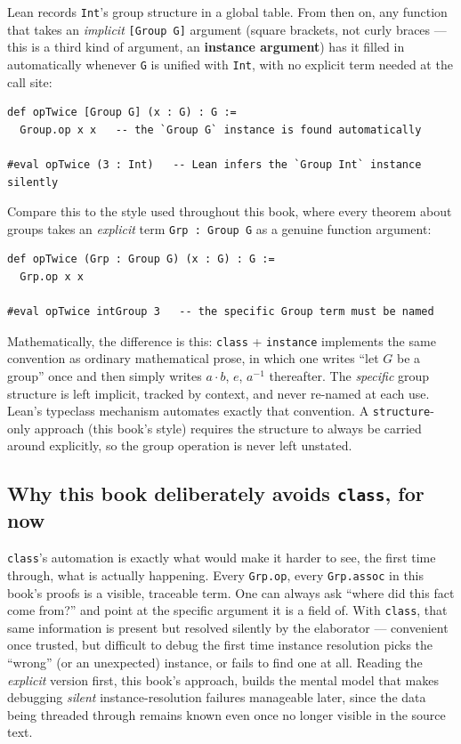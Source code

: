 Lean records \texttt{Int}'s group structure in a global table. From then on, any function that takes an \emph{implicit} \texttt{[Group G]} argument (square brackets, not curly braces --- this is a third kind of argument, an \textbf{instance argument}) has it filled in automatically whenever \texttt{G} is unified with \texttt{Int}, with no explicit term needed at the call site:

\begin{lstlisting}
def opTwice [Group G] (x : G) : G :=
  Group.op x x   -- the `Group G` instance is found automatically

#eval opTwice (3 : Int)   -- Lean infers the `Group Int` instance silently
\end{lstlisting}

Compare this to the style used throughout this book, where every theorem about groups takes an \emph{explicit} term \texttt{Grp : Group G} as a genuine function argument:

\begin{lstlisting}
def opTwice (Grp : Group G) (x : G) : G :=
  Grp.op x x

#eval opTwice intGroup 3   -- the specific Group term must be named
\end{lstlisting}

Mathematically, the difference is this: \texttt{class} + \texttt{instance} implements the same convention as ordinary mathematical prose, in which one writes ``let \(G\) be a group'' once and then simply writes \(a \cdot b\), \(e\), \(a^{-1}\) thereafter. The \emph{specific} group structure is left implicit, tracked by context, and never re-named at each use. Lean's typeclass mechanism automates exactly that convention. A \texttt{structure}-only approach (this book's style) requires the structure to always be carried around explicitly, so the group operation is never left unstated.

\subsection{\texorpdfstring{Why this book deliberately avoids \texttt{class}, for now}{Why this book deliberately avoids class, for now}}\label{sec:05-rigor-check:01-structure-vs-class:3}

\texttt{class}'s automation is exactly what would make it harder to see, the first time through, what is actually happening. Every \texttt{Grp.op}, every \texttt{Grp.assoc} in this book's proofs is a visible, traceable term. One can always ask ``where did this fact come from?'' and point at the specific argument it is a field of. With \texttt{class}, that same information is present but resolved silently by the elaborator --- convenient once trusted, but difficult to debug the first time instance resolution picks the ``wrong'' (or an unexpected) instance, or fails to find one at all. Reading the \emph{explicit} version first, this book's approach, builds the mental model that makes debugging \emph{silent} instance-resolution failures manageable later, since the data being threaded through remains known even once no longer visible in the source text.

